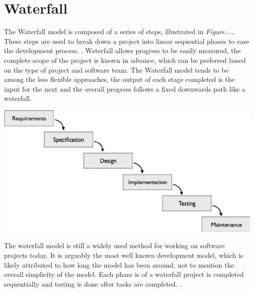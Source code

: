 \section{Waterfall}
The Waterfall model is composed of a series of steps, illustrated in \emph{Figure....}. These steps are used to break down a project into linear sequential phases to ease the development process.  \cite{petersen2009waterfall}. Waterfall allows progress to be easily measured, the complete scope of the project is known in advance, which can be preferred based on the type of project and software team. The Waterfall model tends to be among the less flexible approaches, the output of each stage completed is the input for the next and the overall progress follows a fixed downwards path like a waterfall.

\begin{center}    
      \includegraphics[scale=0.46]{img/Waterfall.png}
\end{center}
\label{fig:x cubed graph}

The waterfall model is still a widely used method for working on software projects today. It is arguably the most well known development model, which is likely attributed to how long the model has been around, not to mention the overall simplicity of the model. Each phase is of a waterfall project is completed sequentially and testing is done after tasks are completed. \cite{balaji2012waterfall}. 


